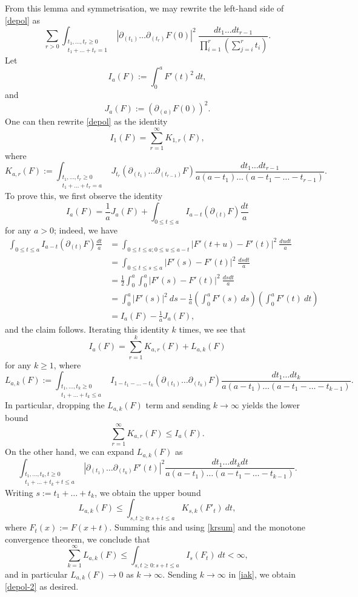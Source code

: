 From this lemma and symmetrisation, we may rewrite the left-hand side of \eqref{depol} as
$$
 \sum_{r>0} \int_{\substack{t_1,\dots,t_r \geq 0\\ t_1+\dots+t_r =1}} |\partial_{(t_1)} \dots \partial_{(t_r)} F(0)|^2\ \frac{dt_1 \dots dt_{r-1}}{\prod_{i=1}^r(\sum_{j=i}^rt_i)}.$$
Let
$$ I_a(F) := \int_0^a F'(t)^2\ dt,$$
and
$$ J_a(F) := (\partial_{(a)} F(0))^2.$$
One can then rewrite \eqref{depol} as the identity
\begin{equation}\label{depol-2}
 I_1(F) = \sum_{r=1}^\infty K_{1,r}(F),
\end{equation}
where
$$ K_{a,r}(F) := \int_{\substack{t_1,\dots,t_r \geq 0\\ t_1+\dots+t_r =a}} J_{t_r}( \partial_{(t_1)} \dots \partial_{(t_{r-1})} F) \frac{dt_1 \dots dt_{r-1}}{a(a-t_1) \dots (a-t_1-\dots-t_{r-1})}.$$
To prove this, we first observe the identity
$$ I_a(F) = \frac{1}{a} J_a(F) + \int_{0 \leq t \leq a} I_{a-t}( \partial_{(t)} F ) \frac{dt}{a}$$
for any $a>0$; indeed, we have
\begin{align*}
\int_{0 \leq t \leq a} I_{a-t}( \partial_{(t)} F ) \frac{dt}{a} &=
\int_{0 \leq t \leq a; 0 \leq u \leq a-t} |F'(t+u) - F'(t)|^2\ \frac{du dt}{a} \\
&= \int_{0 \leq t \leq s \leq a} |F'(s) - F'(t)|^2\ \frac{ds dt}{a} \\
&= \frac{1}{2} \int_0^a \int_0^a |F'(s) - F'(t)|^2\ \frac{ds dt}{a} \\
&= \int_0^a |F'(s)|^2\ ds - \frac{1}{a} (\int_0^a F'(s)\ ds) (\int_0^a F'(t)\ dt) \\
&= I_a(F) - \frac{1}{a} J_a(F),
\end{align*}
and the claim follows.  Iterating this identity $k$ times, we see that
\begin{equation}\label{iak}
I_a(F) = \sum_{r=1}^k K_{a,r}(F) + L_{a,k}(F)
\end{equation}
for any $k \geq 1$, where
$$ L_{a,k}(F) := \int_{\substack{t_1,\dots,t_k \geq 0\\ t_1+\dots+t_k \leq a}} I_{1-t_1-\dots-t_k}( \partial_{(t_1)} \dots \partial_{(t_k)} F) \frac{dt_1 \dots dt_k}{a(a-t_1) \dots (a-t_1-\dots-t_{k-1})}.$$
In particular, dropping the $L_{a,k}(F)$ term and sending $k \to \infty$ yields the lower bound
\begin{equation}\label{krsum}
\sum_{r=1}^\infty K_{a,r}(F) \leq I_a(F).
\end{equation}
On the other hand, we can expand $L_{a,k}(F)$ as
$$ \int_{\substack{t_1,\dots,t_k,t \geq 0\\t_1+\dots+t_k+t \leq a}} |\partial_{(t_1)} \dots \partial_{(t_k)} F'(t)|^2 \frac{dt_1 \dots dt_k dt}{a(a-t_1) \dots (a-t_1-\dots-t_{k-1})}.$$
Writing $s := t_1 + \dots + t_k$, we obtain the upper bound
$$ L_{a,k}(F) \leq \int_{s,t \geq 0: s+t \leq a} K_{s,k}( F'_t )\ dt,$$
where $F_t(x) := F(x+t)$.  Summing this and using \eqref{krsum} and the monotone convergence theorem, we conclude that
$$ \sum_{k=1}^\infty L_{a,k}(F) \leq \int_{s,t \geq 0: s+t \leq a} I_{s}( F_t )\ dt < \infty,$$
and in particular $L_{a,k}(F) \to 0$ as $k \to \infty$.  Sending $k \to \infty$ in \eqref{iak}, we obtain \eqref{depol-2} as desired.


